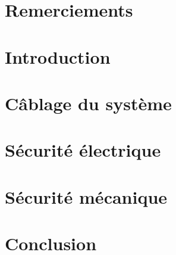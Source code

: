 \documentclass[
    iai, %
    eai, %
    confidential, %
]{heig-tb}
\begin{document}
\maketitle
\frontmatter
\clearemptydoublepage

\preamble
\authentification
\chapter*{Remerciements}


\begin{abstract}
    
\end{abstract}
\clearemptydoublepage
{
    \tableofcontents
    \let\cleardoublepage\clearpage
}
\printnomenclature
\clearemptydoublepage
{}

\mainmatter
\chapter{Introduction}

% 
\chapter{Câblage du système}


\chapter{Sécurité électrique} \label{chapter:securite_electrique}

\chapter{Sécurité mécanique} \label{chapter:securite_mecanique}


\chapter{Conclusion}


\clearemptydoublepage
{
    \listoffigures
    \let\cleardoublepage\clearpage
    \listoftables
    \let\cleardoublepage\clearpage
}
\end{document}
